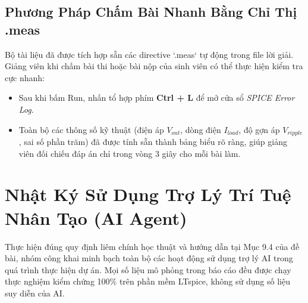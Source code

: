 \documentclass[12pt,a4paper]{report}
\begin{document}
\section{Phương Pháp Chấm Bài Nhanh Bằng Chỉ Thị .meas}
Bộ tài liệu đã được tích hợp sẵn các directive `.meas` tự động trong file lời giải. Giảng viên khi chấm bài thi hoặc bài nộp của sinh viên có thể thực hiện kiểm tra cực nhanh:
\begin{itemize}[noitemsep]
    \item Sau khi bấm Run, nhấn tổ hợp phím \textbf{Ctrl + L} để mở cửa sổ \textit{SPICE Error Log}.
    \item Toàn bộ các thông số kỹ thuật (điện áp $V_{out}$, dòng điện $I_{load}$, độ gợn áp $V_{ripple}$, sai số phần trăm) đã được tính sẵn thành bảng biểu rõ ràng, giúp giảng viên đối chiếu đáp án chỉ trong vòng 3 giây cho mỗi bài làm.
\end{itemize}

\chapter{Nhật Ký Sử Dụng Trợ Lý Trí Tuệ Nhân Tạo (AI Agent)}

Thực hiện đúng quy định liêm chính học thuật và hướng dẫn tại Mục 9.4 của đề bài, nhóm công khai minh bạch toàn bộ các hoạt động sử dụng trợ lý AI trong quá trình thực hiện dự án. Mọi số liệu mô phỏng trong báo cáo đều được chạy thực nghiệm kiểm chứng 100\% trên phần mềm LTspice, không sử dụng số liệu suy diễn của AI.
\end{document}
